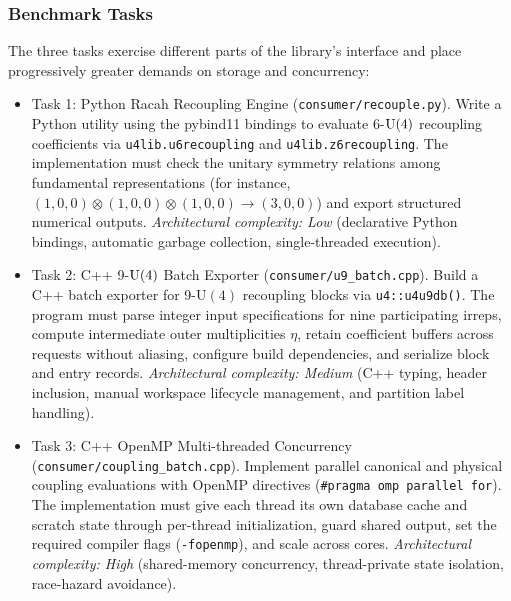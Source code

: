 \documentclass[aps,onecolumn,10pt,superscriptaddress,floatfix,nofootinbib]{revtex4}
\begin{document}
\subsubsection{Benchmark Tasks}
The three tasks exercise different parts of the library's interface and place progressively greater demands on storage and concurrency:
\begin{itemize}
    \item {Task 1: Python Racah Recoupling Engine (\texttt{consumer/recouple.py}).}
    Write a Python utility using the pybind11 bindings to evaluate 6-$\rm U(4)$ recoupling coefficients via \verb|u4lib.u6recoupling| and \verb|u4lib.z6recoupling|. The implementation must check the unitary symmetry relations among fundamental representations (for instance, $(1,0,0) \otimes (1,0,0) \otimes (1,0,0) \to (3,0,0)$) and export structured numerical outputs. \emph{Architectural complexity: Low} (declarative Python bindings, automatic garbage collection, single-threaded execution).

    \item {Task 2: C++ 9-$\rm U(4)$ Batch Exporter (\texttt{consumer/u9\_batch.cpp}).}
    Build a C++ batch exporter for 9-$\mathrm{U}(4)$ recoupling blocks via \verb|u4::u4u9db()|. The program must parse integer input specifications for nine participating irreps, compute intermediate outer multiplicities $\eta$, retain coefficient buffers across requests without aliasing, configure build dependencies, and serialize block and entry records. \emph{Architectural complexity: Medium} (C++ typing, header inclusion, manual workspace lifecycle management, and partition label handling).

    \item {Task 3: C++ OpenMP Multi-threaded Concurrency (\texttt{consumer/coupling\_batch.cpp}).}
    Implement parallel canonical and physical coupling evaluations with OpenMP directives (\verb|#pragma omp parallel for|). The implementation must give each thread its own database cache and scratch state through per-thread initialization, guard shared output, set the required compiler flags (\verb|-fopenmp|), and scale across cores. \emph{Architectural complexity: High} (shared-memory concurrency, thread-private state isolation, race-hazard avoidance).
\end{itemize}
\end{document}
